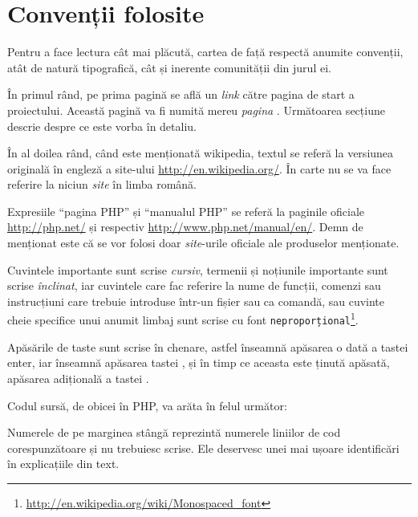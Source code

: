 \section*{Convenții folosite}
{}

Pentru a face lectura cât mai plăcută, cartea de față respectă anumite
convenții, atât de natură tipografică, cât și inerente comunității din jurul
ei.

În primul rând, pe prima pagină se află un \textit{link} către pagina de
start a proiectului. Această pagină va fi numită mereu \textit{pagina \phpro}.
Următoarea secțiune descrie despre ce este vorba în detaliu.

În al doilea rând, când este menționată wikipedia, textul se referă la
versiunea originală în engleză a site-ului \url{http://en.wikipedia.org/}. În
carte nu se va face referire la niciun \textit{site} în limba română.

Expresiile ``pagina PHP'' și ``manualul PHP'' se referă la paginile oficiale
\url{http://php.net/} și respectiv \url{http://www.php.net/manual/en/}. Demn de
menționat este că se vor folosi doar \textit{site}-urile oficiale ale
produselor menționate.


Cuvintele importante sunt scrise \textit{cursiv}, termenii și noțiunile
importante sunt scrise \textsl{înclinat}, iar cuvintele care fac referire la
nume de funcții, comenzi sau instrucțiuni care trebuie introduse într-un fișier
sau ca comandă, sau cuvinte cheie specifice unui anumit limbaj sunt scrise cu
font
\texttt{neproporțional}\footnote{\url{http://en.wikipedia.org/wiki/Monospaced_font}}.

Apăsările de taste sunt scrise în chenare, astfel  înseamnă
apăsarea o dată a tastei enter, iar  înseamnă apăsarea tastei
, și în timp ce aceasta este ținută apăsată, apăsarea
adițională a tastei .

Codul sursă, de obicei în PHP, va arăta în felul următor:



Numerele de pe marginea stângă reprezintă numerele liniilor de cod
corespunzătoare și nu trebuiesc scrise. Ele deservesc unei mai ușoare
identificări în explicațiile din text.

